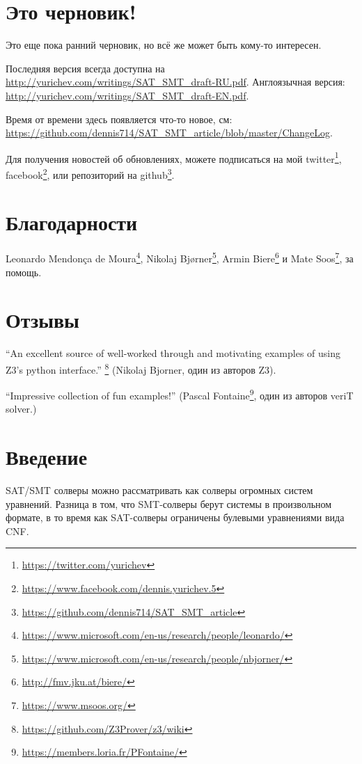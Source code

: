 \section{Это черновик!}

Это еще пока ранний черновик, но всё же может быть кому-то интересен.

Последняя версия всегда доступна на \url{http://yurichev.com/writings/SAT_SMT_draft-RU.pdf}.
Англоязычная версия: \url{http://yurichev.com/writings/SAT_SMT_draft-EN.pdf}.

Время от времени здесь появляется что-то новое, см: \url{https://github.com/dennis714/SAT_SMT_article/blob/master/ChangeLog}.

Для получения новостей об обновлениях, можете подписаться на мой
twitter\footnote{\url{https://twitter.com/yurichev}}, 
facebook\footnote{\url{https://www.facebook.com/dennis.yurichev.5}}, 
или репозиторий на github\footnote{\url{https://github.com/dennis714/SAT_SMT_article}}.

\section{Благодарности}

Leonardo Mendonça de Moura\footnote{\url{https://www.microsoft.com/en-us/research/people/leonardo/}},
Nikolaj Bjørner\footnote{\url{https://www.microsoft.com/en-us/research/people/nbjorner/}},
Armin Biere\footnote{\url{http://fmv.jku.at/biere/}} и
Mate Soos\footnote{\url{https://www.msoos.org/}},
за помощь.

\section{Отзывы}

``An excellent source of well-worked through and motivating examples of using Z3's python interface.''
\footnote{\url{https://github.com/Z3Prover/z3/wiki}}
(Nikolaj Bjorner, один из авторов Z3).

``Impressive collection of fun examples!''
(Pascal Fontaine\footnote{\url{https://members.loria.fr/PFontaine/}}, один из авторов veriT solver.)

\section{Введение}

\ac{SAT}/\ac{SMT} солверы можно рассматривать как солверы огромных систем уравнений.
Разница в том, что \ac{SMT}-солверы берут системы в произвольном формате,
в то время как \ac{SAT}-солверы ограничены булевыми уравнениями вида \ac{CNF}.

